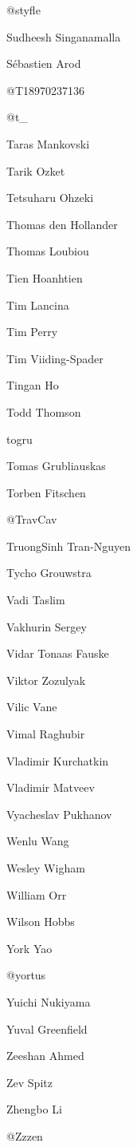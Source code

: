 \begin{DoxyItemize}
\item @styfle
\item Sudheesh Singanamalla
\item Sébastien Arod
\item @\+T18970237136
\item @t\+\_\+
\item Taras Mankovski
\item Tarik Ozket
\item Tetsuharu Ohzeki
\item Thomas den Hollander
\item Thomas Loubiou
\item Tien Hoanhtien
\item Tim Lancina
\item Tim Perry
\item Tim Viiding-\/\+Spader
\item Tingan Ho
\item Todd Thomson
\item togru
\item Tomas Grubliauskas
\item Torben Fitschen
\item @\+Trav\+Cav
\item Truong\+Sinh Tran-\/\+Nguyen
\item Tycho Grouwstra
\item Vadi Taslim
\item Vakhurin Sergey
\item Vidar Tonaas Fauske
\item Viktor Zozulyak
\item Vilic Vane
\item Vimal Raghubir
\item Vladimir Kurchatkin
\item Vladimir Matveev
\item Vyacheslav Pukhanov
\item Wenlu Wang
\item Wesley Wigham
\item William Orr
\item Wilson Hobbs
\item York Yao
\item @yortus
\item Yuichi Nukiyama
\item Yuval Greenfield
\item Zeeshan Ahmed
\item Zev Spitz
\item Zhengbo Li
\item @\+Zzzen 
\end{DoxyItemize}